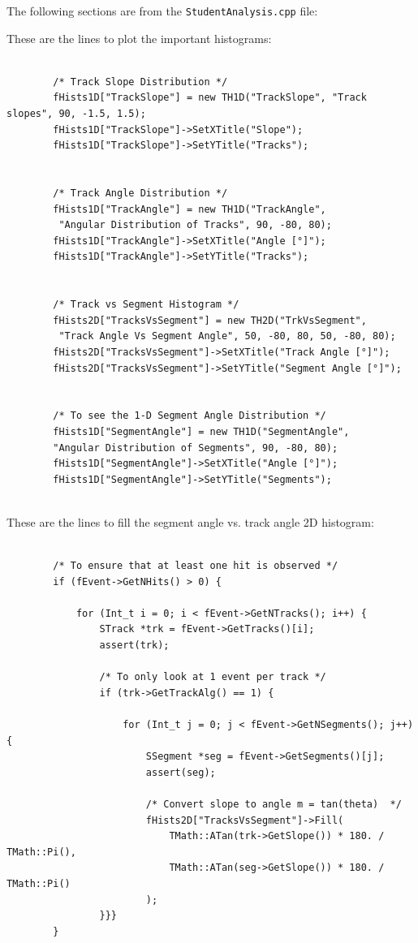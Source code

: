 \documentclass[a4paper]{report}
\numberwithin{equation}{section}
\begin{document}
\noindent The following sections are from the \texttt{StudentAnalysis.cpp} file:

\noindent These are the lines to plot the important histograms: 

\begin{tcolorbox}
	\begin{verbatim}

		/* Track Slope Distribution */
		fHists1D["TrackSlope"] = new TH1D("TrackSlope", "Track slopes", 90, -1.5, 1.5);
		fHists1D["TrackSlope"]->SetXTitle("Slope");
		fHists1D["TrackSlope"]->SetYTitle("Tracks");
	
	
		/* Track Angle Distribution */
		fHists1D["TrackAngle"] = new TH1D("TrackAngle",
		 "Angular Distribution of Tracks", 90, -80, 80);
		fHists1D["TrackAngle"]->SetXTitle("Angle [°]");
		fHists1D["TrackAngle"]->SetYTitle("Tracks");
	
	
		/* Track vs Segment Histogram */
		fHists2D["TracksVsSegment"] = new TH2D("TrkVsSegment",
		 "Track Angle Vs Segment Angle", 50, -80, 80, 50, -80, 80);
		fHists2D["TracksVsSegment"]->SetXTitle("Track Angle [°]");
		fHists2D["TracksVsSegment"]->SetYTitle("Segment Angle [°]");
	
		
		/* To see the 1-D Segment Angle Distribution */
		fHists1D["SegmentAngle"] = new TH1D("SegmentAngle",
		"Angular Distribution of Segments", 90, -80, 80);
		fHists1D["SegmentAngle"]->SetXTitle("Angle [°]");
		fHists1D["SegmentAngle"]->SetYTitle("Segments");
	
	\end{verbatim}
\end{tcolorbox}


\noindent These are the lines to fill the segment angle vs. track angle 2D histogram:

\begin{tcolorbox}
	\begin{verbatim}

		/* To ensure that at least one hit is observed */
		if (fEvent->GetNHits() > 0) { 
		
			for (Int_t i = 0; i < fEvent->GetNTracks(); i++) {
				STrack *trk = fEvent->GetTracks()[i];
				assert(trk);
		
				/* To only look at 1 event per track */
				if (trk->GetTrackAlg() == 1) {
		
					for (Int_t j = 0; j < fEvent->GetNSegments(); j++) {
						SSegment *seg = fEvent->GetSegments()[j];
						assert(seg);
						
						/* Convert slope to angle m = tan(theta)  */
						fHists2D["TracksVsSegment"]->Fill(
							TMath::ATan(trk->GetSlope()) * 180. / TMath::Pi(), 
							TMath::ATan(seg->GetSlope()) * 180. / TMath::Pi()
						);
				}}}
		}
		
	\end{verbatim}
\end{tcolorbox}
\end{document}
